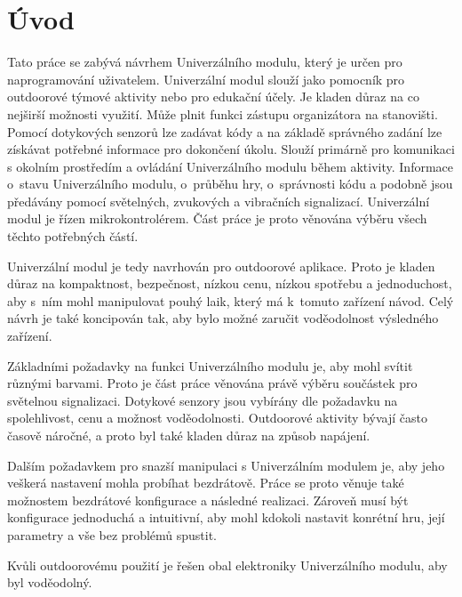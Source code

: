 \chapter*{Úvod}
{}
Tato práce se zabývá návrhem Univerzálního modulu, který je určen pro naprogramování uživatelem. Univerzální modul slouží jako pomocník pro outdoorové 
týmové aktivity nebo pro edukační účely. Je kladen důraz na co 
nejširší možnosti využití. Může plnit funkci zástupu organizátora na stanovišti. Pomocí dotykových senzorů lze zadávat kódy a na základě správného 
zadání lze získávat potřebné informace pro dokončení úkolu. Slouží primárně pro komunikaci s okolním prostředím a ovládání Univerzálního modulu během
aktivity. Informace o~stavu Univerzálního modulu, o~průběhu hry, o~správnosti kódu a podobně
jsou předávány pomocí světelných, zvukových a vibračních signalizací. 
Univerzální modul je řízen mikrokontrolérem. Část práce je proto věnována výběru všech těchto potřebných částí.

Univerzální modul je tedy navrhován pro outdoorové aplikace. Proto je kladen důraz na kompaktnost, bezpečnost, nízkou cenu, nízkou spotřebu a jednoduchost, 
aby s~ním mohl manipulovat pouhý laik, který má k~tomuto zařízení návod. Celý návrh je také koncipován tak, aby bylo možné zaručit voděodolnost 
výsledného zařízení. 

Základními požadavky na funkci Univerzálního modulu je, aby mohl svítit různými barvami. Proto je část práce věnována právě výběru součástek pro světelnou 
signalizaci. Dotykové senzory jsou vybírány dle požadavku na spolehlivost, cenu a možnost voděodolnosti. Outdoorové aktivity bývají často časově náročné, 
a proto byl také kladen důraz na způsob napájení. 

Dalším požadavkem pro snazší manipulaci s Univerzálním modulem je, aby jeho veškerá nastavení mohla probíhat bezdrátově. Práce se proto věnuje také možnostem 
bezdrátové konfigurace a následné realizaci. Zároveň musí být konfigurace jednoduchá a intuitivní, aby mohl kdokoli nastavit konrétní hru, její parametry a 
vše bez problémů spustit.  

Kvůli outdoorovému použití je řešen obal elektroniky Univerzálního modulu, aby byl voděodolný. 






